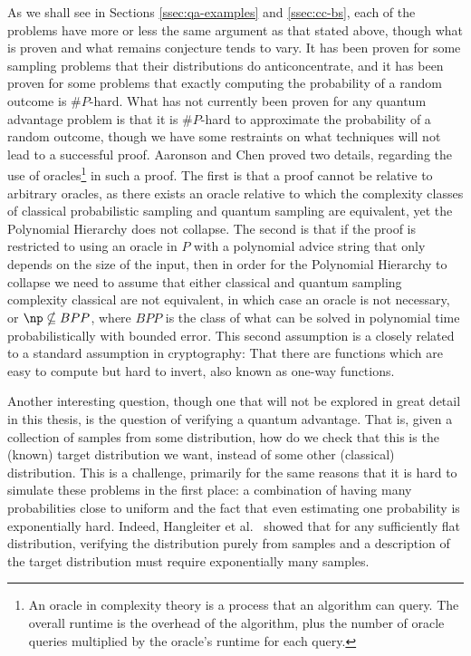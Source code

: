 As we shall see in Sections \ref{ssec:qa-examples} and \ref{ssec:cc-bs}, each of the problems have more or less the same argument as that stated above, though what is proven and what remains conjecture tends to vary. It has been proven for some sampling problems that their distributions do anticoncentrate, and it has been proven for some problems that exactly computing the probability of a random outcome is $\#P$-hard. What has not currently been proven for any quantum advantage problem is that it is $\#P$-hard to approximate the probability of a random outcome, though we have some restraints on what techniques will not lead to a successful proof. Aaronson and Chen \cite{aaronson2016chen} proved two details, regarding the use of oracles\footnote{An oracle in complexity theory is a process that an algorithm can query. The overall runtime is the overhead of the algorithm, plus the number of oracle queries multiplied by the oracle's runtime for each query.} in such a proof. The first is that a proof cannot be relative to arbitrary oracles, as there exists an oracle relative to which the complexity classes of classical probabilistic sampling and quantum sampling are equivalent, yet the Polynomial Hierarchy does not collapse. The second is that if the proof is restricted to using an oracle in $P$ with a polynomial advice string that only depends on the size of the input, then in order for the Polynomial Hierarchy to collapse we need to assume that either classical and quantum sampling complexity classical are not equivalent, in which case an oracle is not necessary, or $\np \nsubseteq BPP$, where $BPP$ is the class of what can be solved in polynomial time probabilistically with bounded error. This second assumption is a closely related to a standard assumption in cryptography: That there are functions which are easy to compute but hard to invert, also known as one-way functions.

Another interesting question, though one that will not be explored in great detail in this thesis, is the question of verifying a quantum advantage. That is, given a collection of samples from some distribution, how do we check that this is the (known) target distribution we want, instead of some other (classical) distribution. This is a challenge, primarily for the same reasons that it is hard to simulate these problems in the first place: a combination of having many probabilities close to uniform and the fact that even estimating one probability is exponentially hard. Indeed, Hangleiter et al.~\cite{hangleiter2019} showed that for any sufficiently flat distribution, verifying the distribution purely from samples and a description of the target distribution must require exponentially many samples.

